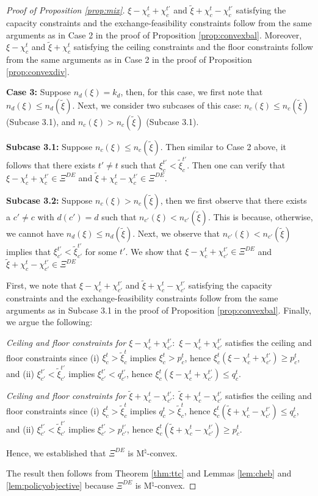 \documentclass[12pt]{amsart}
\theoremstyle{remark}
\begin{document}
\begin{proof}[Proof of Proposition \ref{prop:mix}]
$\xi-\chi_c^t+\chi_{c}^{t'}$ and $\tilde{\xi}+\chi_c^t-\chi_{c}^{t'}$ satisfying the capacity constraints and the exchange-feasibility constraints follow
from the same arguments as in Case 2 in the proof of Proposition \ref{prop:convexbal}. Moreover, $\xi-\chi_c^t$ and $\tilde{\xi}+\chi_c^t$ satisfying the ceiling
constraints and the floor constraints follow from the same arguments as in Case 2 in the proof of Proposition \ref{prop:convexdiv}.

\textbf{Case 3:} Suppose $n_d(\xi) = k_{d}$, then, for this case, we first note that $n_d(\xi) \leq n_d(\tilde \xi)$. Next, we consider two subcases of this case: $n_c(\xi) \le n_c(\tilde \xi)$ (Subcase 3.1), and $n_c(\xi) > n_c(\tilde \xi)$ (Subcase 3.1).


\textbf{Subcase 3.1:} Suppose $n_c(\xi) \leq n_c(\tilde \xi)$. Then similar to Case 2 above, it follows that there exists $t' \neq t$ such that $\xi_c^{t'} < \tilde{\xi}_{c}^{t'}$. Then one can verify that $\xi-\chi_c^t+\chi_{c}^{t'} \in \Xi^{DE}$ and $\tilde{\xi}+\chi_c^t-\chi_{c}^{t'}\in \Xi^{DE}$.

\textbf{Subcase 3.2:} Suppose $n_c(\xi) > n_c(\tilde \xi)$, then we first observe that there exists a $c' \neq c$ with $d(c')=d$ such that
$n_{c'}(\xi) < n_{c'}(\tilde \xi)$. This is because, otherwise, we cannot have $n_d(\xi) \leq n_d(\tilde \xi)$. Next, we observe that $n_{c'}(\xi) < n_{c'}(\tilde \xi)$
implies that $ \xi_{c'}^{t'} <  \tilde{\xi}_{c'}^{t'}$ for some $t'$. We show that $\xi-\chi_c^t+\chi_{c'}^{t'} \in \Xi^{DE}$ and $\tilde{\xi}+\chi_c^t-\chi_{c'}^{t'}\in \Xi^{DE}$

First, we note that $\xi-\chi_c^t+\chi_{c'}^{t'}$ and $\tilde{\xi}+\chi_c^t-\chi_{c'}^{t'}$ satisfying the capacity constraints and the exchange-feasibility constraints follow from the same arguments as in Subcase 3.1 in the proof of Proposition \ref{prop:convexbal}. Finally, we argue the following:

\smallskip
\noindent \emph{Ceiling and floor constraints for $\xi-\chi_c^t+\chi_{c'}^{t'}:$} $\xi-\chi_c^t+\chi_{c'}^{t'}$ satisfies the ceiling and floor constraints since (i) $\xi_c^t>\tilde{\xi}_{c}^{t}$ implies $\xi_c^t>p_{c}^{t}$, hence $\xi_{c}^{t}(\xi-\chi_c^t+\chi_{c'}^{t'}) \geq p_{c}^{t}$, and (ii) $\xi_{c'}^{t'} < \tilde{\xi}_{c'}^{t'}$ implies $\xi_{c'}^{t'}<q_{c'}^{t'}$, hence $\xi_{c}^{t}(\xi-\chi_c^t+\chi_{c'}^{t'}) \leq q_{c}^{t}.$

\smallskip
\noindent \emph{Ceiling and floor constraints for $\tilde{\xi}+\chi_c^t-\chi_{c'}^{t'}:$} $\tilde{\xi}+\chi_c^t-\chi_{c'}^{t'}$ satisfies the ceiling and floor constraints since (i) $\xi_c^t>\tilde{\xi}_{c}^{t}$ implies $q_{c}^{t}>\tilde{\xi}_{c}^{t}$, hence $\xi_{c}^{t}(\tilde{\xi}+\chi_c^t-\chi_{c'}^{t'}) \leq q_{c}^{t}$, and (ii) $\xi_{c'}^{t'} < \tilde{\xi}_{c'}^{t'}$ implies $\xi_{c'}^{t'}>p_{c'}^{t'}$, hence $\xi_{c}^{t}(\tilde{\xi}+\chi_c^t-\chi_{c'}^{t'}) \geq p_{c}^{t}.$

Hence, we established that $\Xi^{DE}$ is M$^{\natural}$-convex.

The result then follows from Theorem \ref{thm:ttc} and Lemmas \ref{lem:cheb} and \ref{lem:policyobjective} because $\Xi^{DE}$ is M$^{\natural}$-convex.
\end{proof}
\end{document}
